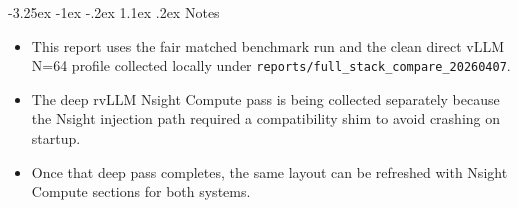 \documentclass[11pt]{article}
\makeatletter
\renewcommand\section{\@startsection{section}{1}{\z@}%
  {-3.25ex \@plus -1ex \@minus -.2ex}%
  {1.1ex \@plus .2ex}%
  {\normalfont\Large\bfseries\color{DeepBlue}}}
\makeatother
\begin{document}
\clearpage
\section{Notes}

\begin{itemize}
\item This report uses the fair matched benchmark run and the clean direct vLLM N=64 profile collected locally under \texttt{reports/full\_stack\_compare\_20260407}.
\item The deep rvLLM Nsight Compute pass is being collected separately because the Nsight injection path required a compatibility shim to avoid crashing on startup.
\item Once that deep pass completes, the same layout can be refreshed with Nsight Compute sections for both systems.
\end{itemize}
\end{document}
